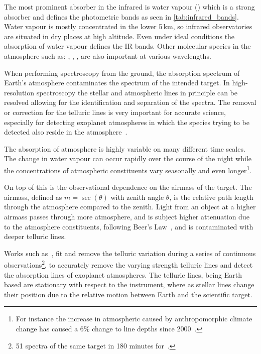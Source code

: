 

The most prominent absorber in the infrared is water vapour () which is a strong absorber and defines the photometric bands as seen in \cref{tab:infrared_bands}.
Water vapour is mostly concentrated in the lower 5\,\si{\kilo\metre}, so infrared observatories are situated in dry places at high altitude.
Even under ideal conditions the absorption of water vapour defines the IR bands.
Other molecular species in the atmosphere such as: , , , are also important at various wavelengths.

When performing spectroscopy from the ground, the absorption spectrum of Earth's atmosphere contaminates the spectrum of the intended target.
In high-resolution spectroscopy the stellar and atmospheric lines in principle can be resolved allowing for the identification and separation of the spectra.
The removal or correction for the telluric lines is very important for accurate science, especially for detecting exoplanet atmospheres in which the species trying to be detected also reside in the atmosphere~\citep{snellen_orbital_2010, brogi_carbon_2014, dekok_detection_2013}.

The absorption of atmosphere is highly variable on many different time scales.
The change in water vapour can occur rapidly over the course of the night while the concentrations of atmospheric constituents vary seasonally and even longer\footnote{For instance the increase in atmospheric  caused by anthropomorphic climate change has caused a 6\% change to  line depths since 2000~\citep{smette_molecfit_2015}.}.

On top of this is the observational dependence on the airmass of the target.
The airmass, defined as \(m = \sec{(\theta)}\) with zenith angle \(\theta\), is the relative path length through the atmosphere compared to the zenith.
Light from an object at a higher airmass passes through more atmosphere, and is subject higher attenuation due to the atmosphere constituents, following Beer's Law~\citep{beer_bestimmung_1852}, and is contaminated with deeper telluric lines.

Works such as~\citet{snellen_orbital_2010}, fit and remove the telluric variation during a series of continuous observations\footnote{51 spectra of the same target in 180 minutes for~\citet{snellen_orbital_2010}.}, to accurately remove the varying strength telluric lines and detect the absorption lines of exoplanet atmospheres.
The telluric lines, being Earth based are stationary with respect to the instrument, where as stellar lines change their position due to the relative motion between Earth and the scientific target.

